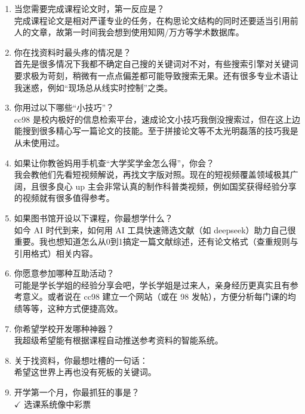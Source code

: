 \begin{enumerate}
    \item 当您需要完成课程论文时，第一反应是？\\
    完成课程论文是相对严谨专业的任务，在构思论文结构的同时还要适当引用前人的文章，故第一时间我会想到使用知网/万方等学术数据库。

    \item 你在找资料时最头疼的情况是？\\
    首先是很多情况下我都不确定自己搜的关键词对不对，有些搜索引擎对关键词要求极为苛刻，稍微有一点点偏差都可能导致搜索无果。还有很多专业术语让我迷惑，例如“现场总从线实时控制”之类。

    \item 你用过以下哪些“小技巧”？\\
    cc98 是校内极好的信息检索平台，速成论文小技巧我倒没搜索过，但在这上边能搜到很多精心写一篇论文的技能。至于拼接论文等不太光明磊落的技巧我是从未使用过。

    \item 如果让你教爸妈用手机查“大学奖学金怎么得”，你会？\\
    我会教他们先看短视频解说，再找文字版对照。现在的短视频覆盖领域极其广阔，且很多良心 up 主会非常认真的制作科普类视频，例如国奖获得经验分享的视频就有很多值得参考。

    \item 如果图书馆开设以下课程，你最想学什么？\\
    如今 AI 时代到来，如何用 AI 工具快速筛选文献（如 deepseek）助力自己很重要。我也想知道怎么从0到1搞定一篇文献综述，还有论文格式（查重规则与引用格式）相关内容。

    \item 你愿意参加哪种互助活动？\\
    可能是学长学姐的经验分享会吧，学长学姐是过来人，亲身经历更真实且有参考意义。或者说在 cc98 建立一个网站（或在 98 发帖），方便分析每门课的均绩等等，这种方式便捷高效。

    \item 你希望学校开发哪种神器？\\
    我超级希望能有根据课程自动推送参考资料的智能系统。

    \item 关于找资料，你最想吐槽的一句话：\\
    希望这世界上再也没有死板的关键词。

    \item 开学第一个月，你最抓狂的事是？\\
    $\checkmark$ 选课系统像中彩票


\end{enumerate}
